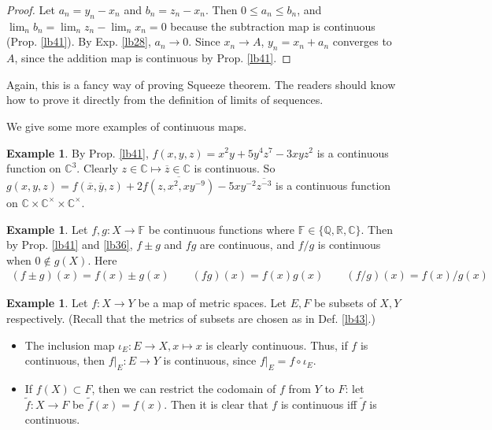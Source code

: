 \documentclass[12pt,b5paper,notitlepage]{article}
\theoremstyle{definition}
\newtheorem{eg}[df]{Example}
\theoremstyle{plain}
\newcommand{\wtd}{\widetilde}
\newcommand{\ovl}{\overline}
\newcommand{\Cbb}{\mathbb C}
\newcommand{\Qbb}{\mathbb Q}
\newcommand{\Rbb}{\mathbb R}
\newcommand{\Fbb}{\mathbb F}
\numberwithin{equation}{section}
\begin{document}
\begin{proof}
Let $a_n=y_n-x_n$ and $b_n=z_n-x_n$. Then $0\leq a_n\leq b_n$, and $\lim_n b_n=\lim_n z_n-\lim_n x_n= 0$ because the subtraction map is continuous (Prop. \ref{lb41}). By Exp. \ref{lb28}, $a_n\rightarrow 0$. Since $x_n\rightarrow A$, $y_n=x_n+a_n$ converges to $A$, since the addition map is continuous by Prop. \ref{lb41}.
\end{proof}

Again, this is a fancy way of proving Squeeze theorem. The readers should know how to prove it directly from the definition of limits of sequences.

We give some more examples of continuous maps.

\begin{eg}
By Prop. \ref{lb41}, $f(x,y,z)=x^2y+5y^4z^7-3xyz^2$ is a continuous function on $\Cbb^3$. Clearly $z\in\Cbb\mapsto \ovl z\in\Cbb$ is continuous. So $g(x,y,z)=f(\ovl x,\ovl y,z)+2\ovl{f(z,x^2,xy^{-9})}-5xy^{-2}\ovl{z^{-3}}$ is a continuous function on $\Cbb\times\Cbb^\times\times\Cbb^\times$.
\end{eg}


\begin{eg}\label{lb44}
Let $f,g:X\rightarrow \Fbb$ be continuous functions where $\Fbb\in\{\Qbb,\Rbb,\Cbb\}$. Then by Prop. \ref{lb41} and \ref{lb36}, $f\pm g$ and $fg$ are continuous, and $f/g$ is continuous when $0\notin g(X)$. Here
\begin{align}
(f\pm g)(x)=f(x)\pm g(x)\qquad (fg)(x)=f(x)g(x)\qquad (f/g)(x)=f(x)/g(x)
\end{align} 
\end{eg}


\begin{eg}\label{lb54}
Let $f:X\rightarrow Y$ be a map of metric spaces. Let $E,F$ be subsets of $X,Y$ respectively. (Recall that the metrics of subsets are chosen as in Def. \ref{lb43}.) 
\begin{itemize}
\item The inclusion map $\iota_E:E\rightarrow X,x\mapsto x$ is clearly continuous. Thus, if $f$ is continuous, then $f|_E:E\rightarrow Y$ is continuous, since $f|_E=f\circ\iota_E$.
\item If $f(X)\subset F$, then we can restrict the codomain of $f$ from $Y$ to $F$: let $\wtd f:X\rightarrow F$ be $\wtd f(x)=f(x)$. Then it is clear that $f$ is continuous iff $\wtd f$ is continuous.
\end{itemize}
\end{eg}
\end{document}
